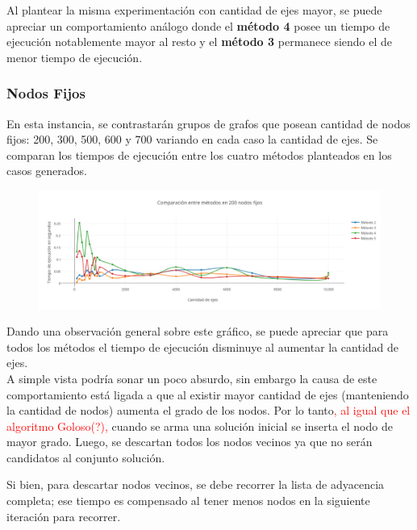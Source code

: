 Al plantear la misma experimentaci\'on con cantidad de ejes mayor, se puede apreciar un comportamiento an\'alogo donde el \textbf{m\'etodo 4} posee un tiempo de ejecuci\'on notablemente mayor al resto y el \textbf{m\'etodo 3} permanece siendo el de menor tiempo de ejecuci\'on.  
  
 \newpage  
  
\subsubsection*{Nodos Fijos}

En esta instancia, se contrastar\'an grupos de grafos que posean cantidad de nodos fijos: 200, 300, 500, 600 y 700 variando en cada caso la cantidad de ejes. Se comparan los tiempos de ejecuci\'on entre los cuatro m\'etodos planteados en los casos generados. 

  \begin{figure}[h!]
   \begin{center}
 	\includegraphics[scale=0.55]{imagenes/local/tiempos/200nodos.png}
   \end{center}
 \end{figure}
 
Dando una observaci\'on general sobre este gr\'afico, se puede apreciar que para todos los m\'etodos el tiempo de ejecuci\'on disminuye al aumentar la cantidad de ejes. \\

A simple vista podr\'ia sonar un poco absurdo, sin embargo la causa de este comportamiento  est\'a ligada a que al existir mayor cantidad de ejes (manteniendo la cantidad de nodos) aumenta el grado de los nodos. Por lo tanto\textcolor{red}{, al igual que el algoritmo Goloso(?), } cuando se arma una soluci\'on inicial se inserta el nodo de mayor grado. Luego, se descartan todos los nodos vecinos ya que no ser\'an candidatos al conjunto soluci\'on.

Si bien, para descartar nodos vecinos, se debe recorrer la lista de adyacencia completa; ese tiempo es compensado al tener menos nodos en la siguiente iteraci\'on para recorrer.\\


